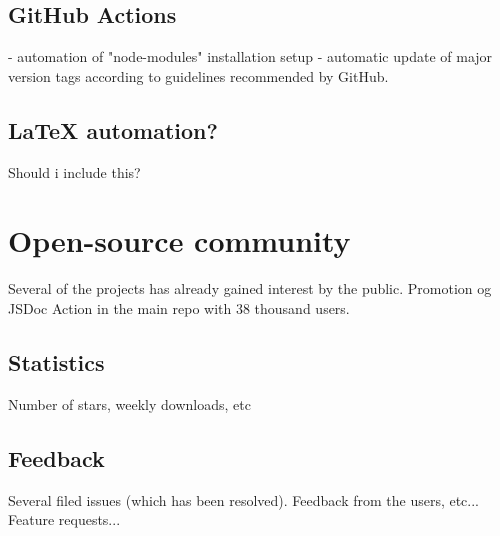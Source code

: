 \subsection{GitHub Actions}
- automation of "node-modules" installation setup
- automatic update of major version tags according to guidelines recommended by GitHub.

\subsection{LaTeX automation?}
Should i include this?

\section{Open-source community}
Several of the projects has already gained interest by the public.
Promotion og JSDoc Action in the main repo with 38 thousand users.

\subsection{Statistics}
Number of stars, weekly downloads, etc
\subsection{Feedback}
Several filed issues (which has been resolved). Feedback from the users, etc... Feature requests...
